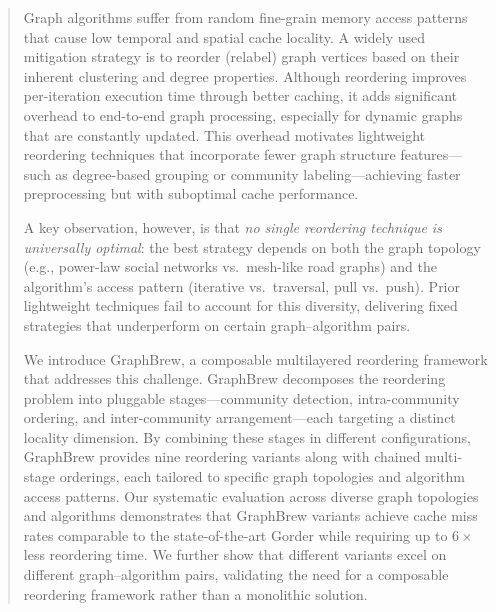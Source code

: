 \documentclass[sigconf, nonacm]{acmart}
\begin{document}
\author{Kevin Skadron}
\begin{abstract}
Graph algorithms suffer from random fine-grain memory access patterns that cause low temporal and spatial cache locality. A widely used mitigation strategy is to reorder (relabel) graph vertices based on their inherent clustering and degree properties. Although reordering improves per-iteration execution time through better caching, it adds significant overhead to end-to-end graph processing, especially for dynamic graphs that are constantly updated. This overhead motivates lightweight reordering techniques that incorporate fewer graph structure features---such as degree-based grouping or community labeling---achieving faster preprocessing but with suboptimal cache performance.

A key observation, however, is that \emph{no single reordering technique is universally optimal}: the best strategy depends on both the graph topology (e.g., power-law social networks vs.\ mesh-like road graphs) and the algorithm's access pattern (iterative vs.\ traversal, pull vs.\ push). Prior lightweight techniques fail to account for this diversity, delivering fixed strategies that underperform on certain graph--algorithm pairs.

We introduce GraphBrew, a composable multilayered reordering framework that addresses this challenge. GraphBrew decomposes the reordering problem into pluggable stages---community detection, intra-community ordering, and inter-community arrangement---each targeting a distinct locality dimension. By combining these stages in different configurations, GraphBrew provides nine reordering variants along with chained multi-stage orderings, each tailored to specific graph topologies and algorithm access patterns. Our systematic evaluation across diverse graph topologies and algorithms demonstrates that GraphBrew variants achieve cache miss rates comparable to the state-of-the-art Gorder while requiring up to $6\times$ less reordering time. We further show that different variants excel on different graph--algorithm pairs, validating the need for a composable reordering framework rather than a monolithic solution.
\end{abstract}

\maketitle
\end{document}
